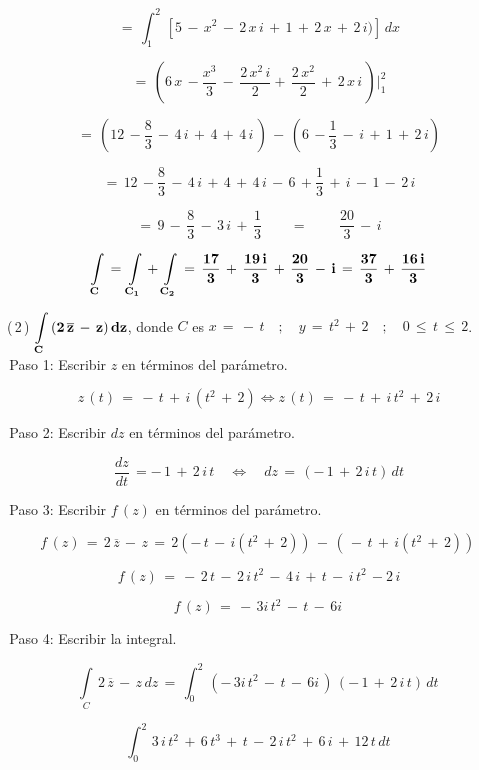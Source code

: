 \documentclass[a4paper,11pt,openany]{book}
\begin{document}
$$=\,\displaystyle\int_{1}^{2}\,[5\,-\,x^{2}\,-\,2\,x\,i\,+\,1\,+\,2\,x\,+\,2\,i)]\,dx$$

$$=\,\left(6\,x\,-\dfrac{x^{3}}{3}\,-\,\dfrac{2\,x^{2}\,i}{2}+\,\dfrac{2\,x^{2}}{2}\,+\,2\,x\,i\,\right)\bigg|_{1}^{2}$$

$$=\,\left(12\,-\dfrac{8}{3}\,-\,4\,i\,+\,4\,+\,4\,i\,\right)\,-\,\left(6\,-\dfrac{1}{3}\,-\,i\,+\,1\,+\,2\,i\right)$$

$$=\,12\,-\dfrac{8}{3}\,-\,4\,i\,+\,4\,+\,4\,i\,-\,6\,+\dfrac{1}{3}\,+\,i\,-\,1\,-\,2\,i$$

$$=\,9\,-\,\dfrac{8}{3}\,-\,3\,i\,+\,\dfrac{1}{3} \qquad=\qquad\,\dfrac{20}{3}\,-\,i$$

$$\bf{\displaystyle\int\limits_{C}\,=\,\displaystyle\int\limits_{C_{1}}\,+\,\displaystyle\int\limits_{C_{2}}\,=\,\dfrac{17}{3}\,+\,\dfrac{19\,i}{3}\,+\,\dfrac{20}{3}\,-\,i\,=\,\dfrac{37}{3}\,+\,\dfrac{16\,i}{3}}$$

\textcolor{ao(english)}{(\,2\,)} $\bf{\displaystyle\int\limits_{C}\,(2\,\overline{z}\,-\,z)\,dz}$, \qquad donde \qquad $C$ es $x\,=\,-\,t \quad;\quad y\,=\,t^{2}\,+\,2 \quad;\quad 0\,\leq\,t\,\leq\,2$.\\

\textcolor{ao(english)}{\,Paso 1:} Escribir $z$ en términos del parámetro.

$$z\,(t)\,=\,-\,t\,+\,i\,(t^{2}\,+\,2) \iff z\,(t)\,=\,-\,t\,+\,i\,t^{2}\,+\,2\,i$$

\textcolor{ao(english)}{\,Paso 2:} Escribir $dz$ en términos del parámetro.

$$\dfrac{dz}{dt}\,=-\,1\,+\,2\,i\,t \quad\iff\quad dz\,=\,(-\,1\,+\,2\,i\,t)\,dt$$

\textcolor{ao(english)}{\,Paso 3:} Escribir $f\,(z)$ en términos del parámetro.

$$f\,(z)\,=\,2\,\overline{z}\,-\,z\,=\,2(-\,t\,-\,i(t^{2}\,+\,2))\,-\,(\,-\,t\,+\,i(t^{2}\,+\,2))\, $$

$$f\,(z)\,= \,-\,2\,t\,-\,2\,i\,t^{2}\,-\,4\,i\,+\,t\,-\,i\,t^{2}\,-2\,i  $$

$$f\,(z)\,= \,-\,3i\,t^{2}\,-\,t\,-\,6i\,  $$

\textcolor{ao(english)}{\,Paso 4:} Escribir la integral.

$$\displaystyle\int\limits_{C}\,2\,\overline{z}\,-\,z\,dz\,=\,\displaystyle\int_{0}^{2}\,(-\,3i\,t^{2}\,-\,t\,-\,6i\,)\,(-\,1\,+\,2\,i\,t)\,dt\,$$

$$\displaystyle\int_{0}^{2}\,3\,i\,t^{2}\,+\,6\,t^{3}\,+\,t\,-\,2\,i\,t^{2}\,+\,6\,i\,+\,12\,t\, dt\,$$
\end{document}
